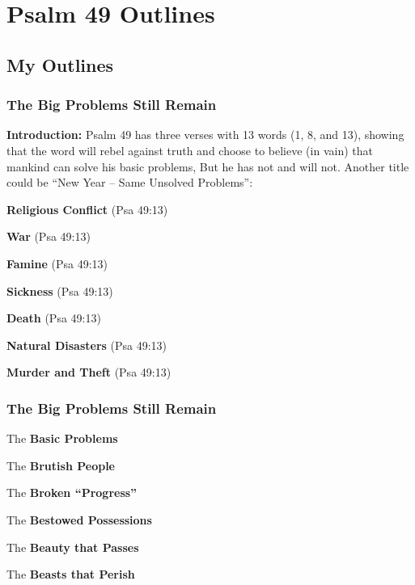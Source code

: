 \section{Psalm 49 Outlines}

\subsection{My Outlines}

\subsubsection{The Big Problems Still Remain}
\textbf{Introduction:} Psalm 49 has three verses with 13 words (1, 8, and 13), showing that the word will rebel against truth and choose to believe (in vain) that mankind can solve his basic problems, But he has not and will not. Another title could be ``New Year -- Same Unsolved Problems'':
\begin{compactenum}[I.][8]
    \item \textbf{Religious Conflict}  (Psa 49:13)
    \item \textbf{War}  (Psa 49:13)
    \item \textbf{Famine}  (Psa 49:13)
    \item \textbf{Sickness}  (Psa 49:13)
    \item \textbf{Death}  (Psa 49:13)
    \item \textbf{Natural Disasters}  (Psa 49:13)
    \item \textbf{Murder and Theft}  (Psa 49:13)
\end{compactenum}


\subsubsection{The Big Problems Still Remain}

\begin{compactenum}[I.][8]
    \item The \textbf{Basic Problems}
    \item The \textbf{Brutish People}
    \item The \textbf{Broken ``Progress''}
    \item The \textbf{Bestowed Possessions}
    \item The \textbf{Beauty that Passes}
    \item The \textbf{Beasts that Perish}
\end{compactenum}

